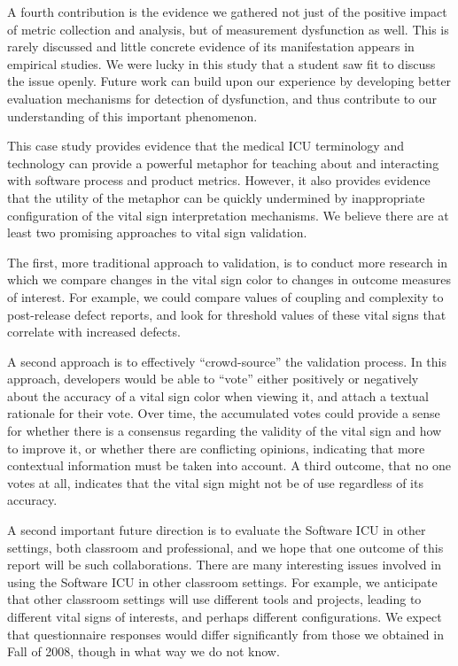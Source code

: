 \documentclass[10pt,twocolumn]{article}
\begin{document}
A fourth contribution is the evidence we gathered not just of the positive
impact of metric collection and analysis, but of measurement dysfunction as
well.  This is rarely discussed and little concrete evidence of its
manifestation appears in empirical studies.  We were lucky in this study
that a student saw fit to discuss the issue openly.  Future work can build
upon our experience by developing better evaluation mechanisms for
detection of dysfunction, and thus contribute to our understanding of this
important phenomenon.


This case study provides evidence that the medical ICU terminology and
technology can provide a powerful metaphor for teaching about and
interacting with software process and product metrics.  However, it also
provides evidence that the utility of the metaphor can be quickly
undermined by inappropriate configuration of the vital sign interpretation
mechanisms.  We believe there are at least two promising approaches to
vital sign validation.

The first, more traditional approach to validation, is to conduct more
research in which we compare changes in the vital sign color to changes in
outcome measures of interest.  For example, we could compare values of
coupling and complexity to post-release defect reports, and look for
threshold values of these vital signs that correlate with increased
defects.

A second approach is to effectively ``crowd-source'' the validation
process.  In this approach, developers would be able to ``vote'' either
positively or negatively about the accuracy of a vital sign color when
viewing it, and attach a textual rationale for their vote.  Over time, the
accumulated votes could provide a sense for whether there is a consensus
regarding the validity of the vital sign and how to improve it, or whether
there are conflicting opinions, indicating that more contextual information
must be taken into account.  A third outcome, that no one votes at all,
indicates that the vital sign might not be of use regardless of its
accuracy.

A second important future direction is to evaluate the Software ICU in other
settings, both classroom and professional, and we hope that one outcome of
this report will be such collaborations.  There are many interesting issues
involved in using the Software ICU in other classroom settings. For
example, we anticipate that other classroom settings will use different
tools and projects, leading to different vital signs of interests, and
perhaps different configurations.  We expect that questionnaire
responses would differ significantly from those we obtained in Fall of
2008, though in what way we do not know.
\end{document}

